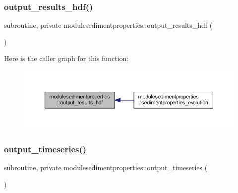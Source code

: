 \subsubsection{\texorpdfstring{output\+\_\+results\+\_\+hdf()}{output\_results\_hdf()}}
{\footnotesize\ttfamily subroutine, private modulesedimentproperties\+::output\+\_\+results\+\_\+hdf (\begin{DoxyParamCaption}{ }\end{DoxyParamCaption})\hspace{0.3cm}{\ttfamily [private]}}

Here is the caller graph for this function\+:\nopagebreak
\begin{figure}[H]
\begin{center}
\leavevmode
\includegraphics[width=350pt]{namespacemodulesedimentproperties_adcdacad517c08441d00e6cb73a5bff47_icgraph}
\end{center}
\end{figure}
\mbox{\label{namespacemodulesedimentproperties_a45f67a80f9c968c6138d9eeef961a523}} 
\subsubsection{\texorpdfstring{output\+\_\+timeseries()}{output\_timeseries()}}
{\footnotesize\ttfamily subroutine, private modulesedimentproperties\+::output\+\_\+timeseries (\begin{DoxyParamCaption}{ }\end{DoxyParamCaption})\hspace{0.3cm}{\ttfamily [private]}}

